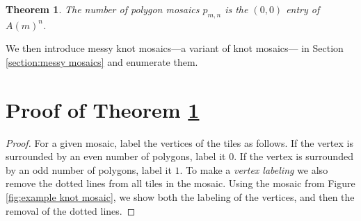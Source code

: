 \documentclass[12pt]{article}
\theoremstyle{plain}
\newtheorem{thm}{Theorem}[section]
\theoremstyle{definition}
\theoremstyle{remark}
\theoremstyle{definition}
\begin{document}
\begin{thm}
\label{thm: main theorem}    
The number of polygon mosaics $p_{m,n}$ is the $(0,0)$ entry of $A(m)^n$.
\end{thm}

We then introduce messy knot mosaics—a variant of knot mosaics— in Section \ref{section:messy mosaics} and enumerate them.

\section{Proof of Theorem \ref{thm: main theorem}}

\begin{proof}


For a given mosaic, label the vertices of the tiles as follows. If the vertex is surrounded by an even number of polygons, label it $0$. If the vertex is surrounded by an odd number of polygons, label it $1$. To make a \textit{vertex labeling} we also remove the dotted lines from all tiles in the mosaic. Using the mosaic from Figure \ref{fig:example knot mosaic}, we show both the labeling of the vertices, and then the removal of the dotted lines.


\end{proof}
\end{document}

